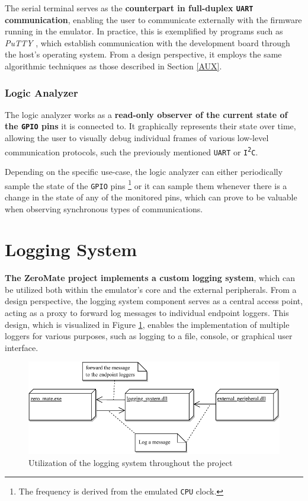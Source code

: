 \documentclass[english, ing, kiv, he, iso690numb, pdf]{fasthesis}
\begin{document}
	The serial terminal serves as the \textbf{counterpart in full-duplex \texttt{UART} communication}, enabling the user to communicate externally with the firmware running in the emulator. In practice, this is exemplified by programs such as \textit{PuTTY} \cite{putty}, which establish communication with the development board through the host's operating system. From a design perspective, it employs the same algorithmic techniques as those described in Section \ref{AUX}.
	
	\subsubsection{Logic Analyzer}
	
	The logic analyzer works as a \textbf{read-only observer of the current state of the \texttt{GPIO} pins} it is connected to. It graphically represents their state over time, allowing the user to visually debug individual frames of various low-level communication protocols, such the previously mentioned \texttt{UART} or \texttt{I\textsuperscript{2}C}.
	
	Depending on the specific use-case, the logic analyzer can either periodically sample the state of the \texttt{GPIO} pins \footnote{The frequency is derived from the emulated \texttt{CPU} clock.} or it can sample them whenever there is a change in the state of any of the monitored pins, which can prove to be valuable when observing synchronous types of communications.
	
	\section{Logging System} 
	
	\textbf{The ZeroMate project implements a custom logging system}, which can be utilized both within the emulator's core and the external peripherals. From a design perspective, the logging system component serves as a central access point, acting as a proxy to forward log messages to individual endpoint loggers. This design, which is visualized in Figure \ref{Utilization of the logging system throughout the project}, enables the implementation of multiple loggers for various purposes, such as logging to a file, console, or graphical user interface.
	
	\begin{figure}[ht]
		\centering
		\includegraphics[width=1.0\textwidth]{img/diagrams/logging_system.pdf}
		\caption{Utilization of the logging system throughout the project}
		\label{Utilization of the logging system throughout the project}
	\end{figure}
	
\end{document}
